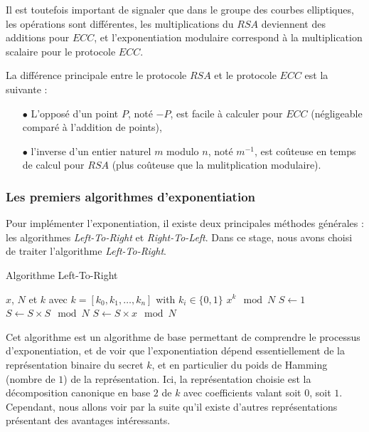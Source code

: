 \documentclass[12pt, a4paper]{memoir}
\begin{document}
Il est toutefois important de signaler que dans le groupe des courbes elliptiques, les opérations sont différentes, 
les multiplications du $RSA$ deviennent des additions pour $ECC$, et l'exponentiation modulaire correspond
à la multiplication scalaire pour le protocole $ECC$.

La différence principale entre le protocole $RSA$ et le protocole $ECC$ est la suivante :
\begin{itemize}
 \item [$\bullet$] L'opposé d'un point $P$, noté $-P$, est facile à calculer pour $ECC$ 
 (négligeable comparé à l'addition de points),
 \item [$\bullet$] l'inverse d'un entier naturel $m$ modulo $n$, noté $m^{-1}$, 
 est coûteuse en temps de calcul pour $RSA$ (plus coûteuse que la mulitplication modulaire).
\end{itemize}

\subsubsection{Les premiers algorithmes d'exponentiation}

Pour implémenter l'exponentiation, il existe deux principales méthodes générales : les algorithmes \emph{Left-To-Right} et \emph{Right-To-Left}.
Dans ce stage, nous avons choisi de traiter l'algorithme \emph{Left-To-Right}.

\begin{algorithm}
 \caption{Algorithme Left-To-Right}
 \begin{algorithmic}
  \REQUIRE $x$, $N$ et $k$ avec $k = [k_0,k_1,\ldots,k_n]$ with $k_i \in \{0,1\}$
  \ENSURE $x^k \mod N$
  \STATE $S \leftarrow 1$
  \STATE $S \leftarrow S \times S \mod N$
  \STATE $S \leftarrow S \times x \mod N$
  \ENDIF
  \ENDFOR
 \end{algorithmic}
\end{algorithm}

Cet algorithme est un algorithme de base permettant de comprendre le processus d'exponentiation,
et de voir que l'exponentiation dépend essentiellement de la représentation binaire du secret $k$, et en particulier du poids de Hamming (nombre de $1$) de la représentation.
Ici, la représentation choisie est la décomposition canonique en base $2$ de $k$ avec coefficients valant soit $0$, soit $1$.
Cependant, nous allons voir par la suite qu'il existe d'autres représentations présentant des avantages intéressants. 
\end{document}

